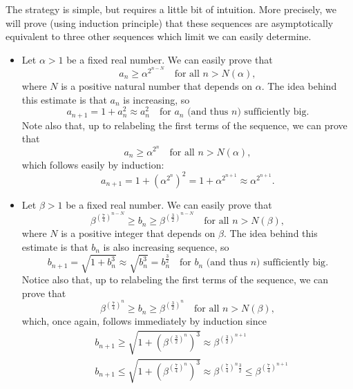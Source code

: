\documentclass[a4paper,10 pt]{report}
\theoremstyle{definition}
\begin{document}
\begin{solutionBox} 
The strategy is simple, but requires a little bit of intuition. More precisely, we will prove (using induction principle) that these sequences are asymptotically equivalent to three other sequences which limit we can easily determine.

\begin{itemize}
	\item Let $\alpha > 1$ be a fixed real number. We can easily prove that
\begin{equation*} a_n \geq \alpha^{2^{n-N}} \quad \text{for all $n > N(\alpha)$}, \end{equation*}
where $N$ is a positive natural number that depends on $\alpha$. The idea behind this estimate is that $a_n$ is increasing, so
\begin{equation*} a_{n + 1} = 1 + a_n^2 \approx a_n^2 \quad \text{for $a_n$ (and thus $n$) sufficiently big}. \end{equation*}
Note also that, up to relabeling the first terms of the sequence, we can prove that
\begin{equation*} a_n \geq \alpha^{2^{n}} \quad \text{for all $n > N(\alpha)$}, \end{equation*}
which follows easily by induction:
\begin{equation*} a_{n + 1} = 1 + \left( \alpha^{2^{n}} \right)^2  = 1 + \alpha^{2^{n + 1}} \approx \alpha^{2^{n + 1}}. \end{equation*}

\item Let $\beta > 1$ be a fixed real number. We can easily prove that
\begin{equation*} \beta^{\left(\frac{7}{4}\right)^{n-N}} \geq b_n \geq \beta^{\left(\frac{3}{2}\right)^{n-N}} \quad \text{for all $n > N(\beta)$}, \end{equation*}
where $N$ is a positive integer that depends on $\beta$. The idea behind this estimate is that $b_n$ is also increasing sequence, so
\begin{equation*} b_{n + 1} = \sqrt{1 + b_n^3} \approx \sqrt{b_n^3} = b_n^{\frac{3}{2}} \quad \text{for $b_n$ (and thus $n$) sufficiently big}. \end{equation*}
Notice also that, up to relabeling the first terms of the sequence, we can prove that
\begin{equation*} \beta^{\left(\frac{7}{4}\right)^{n}} \geq b_n \geq \beta^{\left(\frac{3}{2}\right)^{n}} \quad \text{for all $n > N(\beta)$}, \end{equation*}
which, once again, follows immediately by induction since
\[
\begin{aligned} 
& b_{n + 1} \geq \sqrt{1 + \left(\beta^{\left(\frac{3}{2}\right)^{n}} \right)^3}  \approx \beta^{\left(\frac{3}{2}\right)^{n + 1}}
\\ & b_{n + 1} \leq \sqrt{1 + \left(\beta^{\left(\frac{7}{4}\right)^{n}} \right)^3} \approx \beta^{\left(\frac{7}{4}\right)^{n} \frac{3}{2}}  \leq \beta^{\left(\frac{7}{4}\right)^{n + 1}}
\end{aligned}
\]


\end{itemize}
\end{solutionBox}
\end{document}
